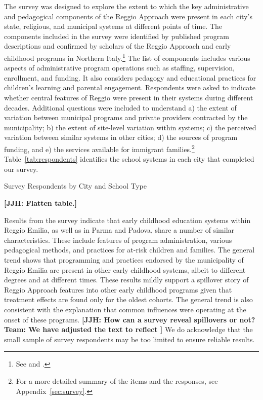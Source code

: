 The survey was designed to explore the extent to which the key administrative and pedagogical components of the Reggio Approach were present in each city's state, religious, and municipal systems at different points of time. The components included in the survey were identified by published program descriptions and confirmed by scholars of the Reggio Approach and early childhood programs in Northern Italy.\footnote{See \citet{Edwards-etal-eds_1998_Hundred-Languages} and \citet{Corsaro_2008_Policy-Practice}.} The list of components includes various aspects of administrative program operations such as staffing, supervision, enrollment, and funding. It also considers pedagogy and educational practices for children's learning and parental engagement. Respondents were asked to indicate whether central features of Reggio were present in their systems during different decades. Additional questions were included to understand a) the extent of variation between municipal programs and private providers contracted by the municipality; b) the extent of site-level variation within systems; c) the perceived variation between similar systems in other cities; d) the sources of program funding, and e) the services available for immigrant families.\footnote{For a more detailed summary of the items and the responses, see Appendix~\ref{sec:survey}.} Table~\ref{tab:respondents} identifies the school systems in each city that completed our survey.

\begin{table}[H]
\centering
\caption{Survey Respondents by City and School Type}\label{tab:respondents}
\begin{adjustbox}{width=\textwidth}
\begin{threeparttable}
	
\begin{tablenotes}
\end{tablenotes}
\end{threeparttable}
\end{adjustbox}
\end{table}

\textbf{[JJH: Flatten table.]}

Results from the survey indicate that early childhood education systems within Reggio Emilia, as well as in Parma and Padova, share a number of similar characteristics. These include features of program administration, various pedagogical methods, and practices for at-risk children and families. The general trend shows that programming and practices endorsed by the municipality of Reggio Emilia are present in other early childhood systems, albeit to different degrees and at different times. These results mildly support a spillover story of Reggio Approach features into other early childhood programs given that treatment effects are found only for the oldest cohorts. The general trend is also consistent with the explanation that common influences were operating at the onset of these programs. \textbf{[JJH: How can a survey reveal spillovers or not? Team: We have adjusted the text to reflect ]} We do acknowledge that the small sample of survey respondents may be too limited to ensure reliable results.

